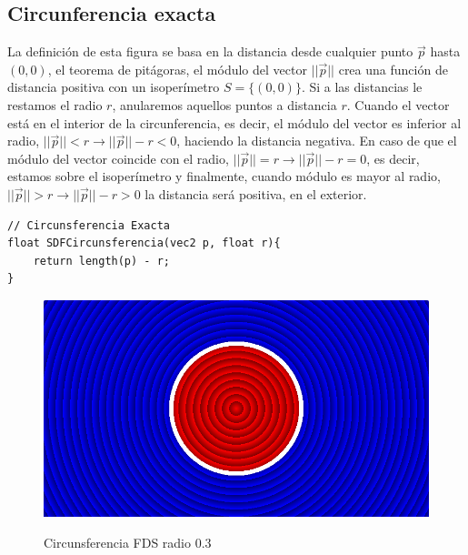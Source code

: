 \subsection{Circunferencia exacta}
La definición de esta figura se basa en la distancia desde cualquier punto \(\Vec{p}\) hasta \((0,0)\), el teorema de pitágoras, el módulo del vector \(\vert\vert\Vec{p}\vert\vert\)  crea una función de distancia positiva con un isoperímetro \(S=\{(0,0)\}\). Si a las distancias le restamos el radio \(r\), anularemos aquellos puntos a distancia \(r\). Cuando el vector está en el interior de la circunferencia, es decir, el módulo del vector es inferior al radio, \(\vert\vert\Vec{p}\vert\vert < r \longrightarrow \vert\vert\Vec{p}\vert\vert - r < 0\), haciendo la distancia negativa. En caso de que el módulo del vector coincide con el radio, \(\vert\vert\Vec{p}\vert\vert = r \longrightarrow \vert\vert\Vec{p}\vert\vert - r = 0\), es decir, estamos sobre el isoperímetro y finalmente, cuando módulo es mayor al radio, \(\vert\vert\Vec{p}\vert\vert > r \longrightarrow \vert\vert\Vec{p}\vert\vert - r > 0\) la distancia será positiva, en el exterior.
\begin{lstlisting}
// Circunsferencia Exacta
float SDFCircunsferencia(vec2 p, float r){
    return length(p) - r;
}
\end{lstlisting}
\begin{figure}[H]
  \centering
  \captionsetup{justification=centering}%
  \includegraphics[width=1.0\textwidth]{secciones/imagenes/sdf/2d/sdf_circunsferencia.png}\label{fig:circ}
  \caption{Circunsferencia FDS radio \(0.3\)}
\end{figure}

